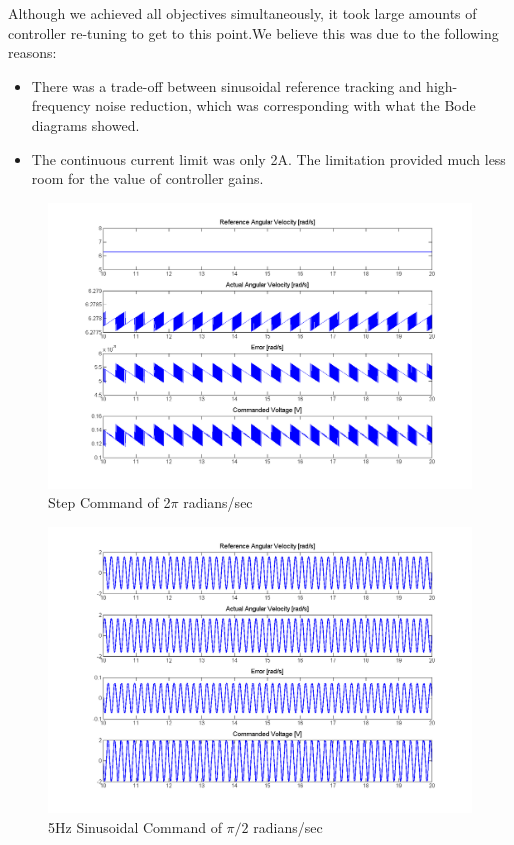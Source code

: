 \documentclass{article}
\theoremstyle{plain}
\theoremstyle{definition}
\theoremstyle{remark}
\begin{document}
Although we achieved all objectives simultaneously, it took large amounts of controller re-tuning to get to this point.We believe this was due to the following reasons: 
\begin{itemize}
\item There was a trade-off between sinusoidal reference tracking and high-frequency noise reduction, which was corresponding with what the Bode diagrams showed. 
\item The continuous current limit was only 2A. The limitation provided much less room for the value of controller gains.  
\end{itemize}

\begin{figure}[htb]
\begin{center}
\includegraphics[width = 14 cm]{q3_12}
\caption{Step Command of 2$\pi$ radians/sec}
\label{q3_12}
\end{center}
\end{figure}

\begin{figure}[htb]
\begin{center}
\includegraphics[width = 14 cm]{q3_13}
\caption{5Hz Sinusoidal Command of $\pi/2$ radians/sec}
\label{q3_13}
\end{center}
\end{figure}
\end{document}
